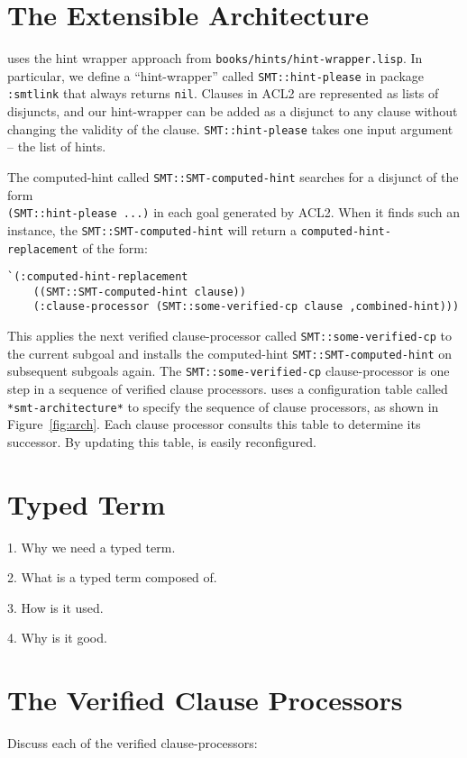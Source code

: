 \section{The Extensible Architecture}



\smtlink{} uses the hint wrapper approach from
\texttt{books/hints/hint-wrapper.lisp}.
In particular, we define a ``hint-wrapper'' called \texttt{SMT::hint-please} in
package \texttt{:smtlink} that always returns \texttt{nil}.
Clauses in ACL2 are represented as lists of disjuncts, and our hint-wrapper
can be added as a disjunct to any clause without changing the validity of the
clause.
\texttt{SMT::hint-please} takes one input argument -- the list of hints.

The computed-hint called \texttt{SMT::SMT-computed-hint} searches for a
disjunct of the form \\
\texttt{(SMT::hint-please ...)} in each goal generated by ACL2.
When it finds such an instance, the \texttt{SMT::SMT-computed-hint}
will return a \texttt{computed-hint-replacement} of the form:
\begin{lstlisting}[style=codestyle]
  `(:computed-hint-replacement
    ((SMT::SMT-computed-hint clause))
    (:clause-processor (SMT::some-verified-cp clause ,combined-hint)))
\end{lstlisting}
This applies the next verified clause-processor called
\texttt{SMT::some-verified-cp} to the current subgoal and installs the
computed-hint \texttt{SMT::SMT-computed-hint} on subsequent subgoals again.
The \texttt{SMT::some-verified-cp} clause-processor is one step in a sequence of
verified clause processors.
\smtlink{} uses a configuration table called \texttt{*smt-architecture*} to
specify the sequence of clause processors, as shown in Figure~\ref{fig:arch}.
Each clause processor consults this table to determine its successor.
By updating this table, \smtlink{} is easily reconfigured.

\section{Typed Term}
1. Why we need a typed term.

2. What is a typed term composed of.

3. How is it used.

4. Why is it good.

\section{The Verified Clause Processors}
Discuss each of the verified clause-processors:

